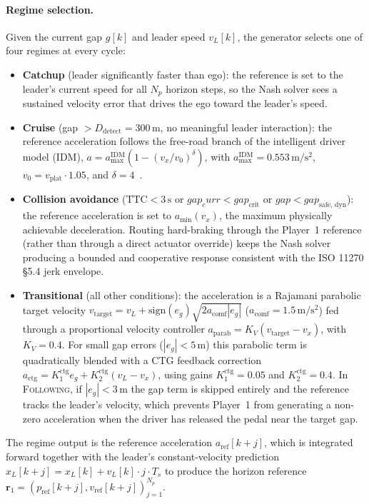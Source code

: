 \documentclass[12pt,a4paper,oneside]{report}
\begin{document}
\paragraph{Regime selection.} Given the current gap $g[k]$ and leader speed $v_L[k]$, the generator selects one of four regimes at every cycle:
\begin{itemize}
\item \textbf{Catchup} (leader significantly faster than ego): the reference is set to the leader's current speed for all $N_p$ horizon steps, so the Nash solver sees a sustained velocity error that drives the ego toward the leader's speed.
\item \textbf{Cruise} (gap $> D_{\text{detect}} = 300\,\mathrm{m}$, no meaningful leader interaction): the reference acceleration follows the free-road branch of the intelligent driver model (IDM), $a = a_{\max}^{\text{IDM}} \left( 1 - (v_x / v_0)^{\delta} \right)$, with $a_{\max}^{\text{IDM}} = 0.553\,\mathrm{m/s^2}$, $v_0 = v_{\text{plat}} \cdot 1.05$, and $\delta = 4$~\cite{treiberCongestedTrafficStates2000, treiberTrafficFlowDynamics2013}.
\item \textbf{Collision avoidance} ($\text{TTC} < 3\,\mathrm{s}$ or $gap_curr < gap_{\text{crit}}$ or $gap < gap_{\text{safe, dyn}}$): the reference acceleration is set to $a_{\min}(v_x)$, the maximum physically achievable deceleration. Routing hard-braking through the Player~1 reference (rather than through a direct actuator override) keeps the Nash solver producing a bounded and cooperative response consistent with the ISO 11270 §5.4 jerk envelope.
\item \textbf{Transitional} (all other conditions): the acceleration is a Rajamani parabolic target velocity $v_{\text{target}} = v_L + \mathrm{sign}(e_g) \sqrt{2 a_{\text{comf}} |e_g|}$ ($a_{\text{comf}} = 1.5\,\mathrm{m/s^2}$) fed through a proportional velocity controller $a_{\text{parab}} = K_V (v_{\text{target}} - v_x)$, with $K_V = 0.4$. For small gap errors ($|e_g| < 5\,\mathrm{m}$) this parabolic term is quadratically blended with a CTG feedback correction $a_{\text{ctg}} = K_1^{\text{ctg}} e_g + K_2^{\text{ctg}} (v_L - v_x)$, using gains $K_1^{\text{ctg}} = 0.05$ and $K_2^{\text{ctg}} = 0.4$. In \textsc{Following}, if $|e_g| < 3\,\mathrm{m}$ the gap term is skipped entirely and the reference tracks the leader's velocity, which prevents Player~1 from generating a non-zero acceleration when the driver has released the pedal near the target gap.
\end{itemize}
The regime output is the reference acceleration $a_{\text{ref}}[k+j]$, which is integrated forward together with the leader's constant-velocity prediction $x_L[k+j] = x_L[k] + v_L[k] \cdot j \cdot T_s$ to produce the horizon reference $\mathbf{r}_1 = (p_{\text{ref}}[k+j], v_{\text{ref}}[k+j])_{j=1}^{N_p}$.
\end{document}
